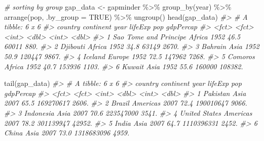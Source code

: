 \documentclass[
]{book}
\newenvironment{Shaded}{\begin{snugshade}}{\end{snugshade}}
\newcommand{\AttributeTok}[1]{\textcolor[rgb]{0.77,0.63,0.00}{#1}}
\newcommand{\CommentTok}[1]{\textcolor[rgb]{0.56,0.35,0.01}{\textit{#1}}}
\newcommand{\ConstantTok}[1]{\textcolor[rgb]{0.00,0.00,0.00}{#1}}
\newcommand{\FunctionTok}[1]{\textcolor[rgb]{0.00,0.00,0.00}{#1}}
\newcommand{\NormalTok}[1]{#1}
\newcommand{\OtherTok}[1]{\textcolor[rgb]{0.56,0.35,0.01}{#1}}
\newcommand{\SpecialCharTok}[1]{\textcolor[rgb]{0.00,0.00,0.00}{#1}}
\begin{document}
\begin{Shaded}
\begin{Highlighting}[]
\CommentTok{\# sorting by group}
\NormalTok{gap\_data }\OtherTok{\textless{}{-}}
\NormalTok{gapminder }\SpecialCharTok{\%\textgreater{}\%}
  \FunctionTok{group\_by}\NormalTok{(year) }\SpecialCharTok{\%\textgreater{}\%}
  \FunctionTok{arrange}\NormalTok{(pop, }\AttributeTok{.by\_group =} \ConstantTok{TRUE}\NormalTok{) }\SpecialCharTok{\%\textgreater{}\%}
  \FunctionTok{ungroup}\NormalTok{()}
\FunctionTok{head}\NormalTok{(gap\_data)}
\CommentTok{\#\textgreater{} \# A tibble: 6 x 6}
\CommentTok{\#\textgreater{}   country               continent  year lifeExp    pop gdpPercap}
\CommentTok{\#\textgreater{}   \textless{}fct\textgreater{}                 \textless{}fct\textgreater{}     \textless{}int\textgreater{}   \textless{}dbl\textgreater{}  \textless{}int\textgreater{}     \textless{}dbl\textgreater{}}
\CommentTok{\#\textgreater{} 1 Sao Tome and Principe Africa     1952    46.5  60011      880.}
\CommentTok{\#\textgreater{} 2 Djibouti              Africa     1952    34.8  63149     2670.}
\CommentTok{\#\textgreater{} 3 Bahrain               Asia       1952    50.9 120447     9867.}
\CommentTok{\#\textgreater{} 4 Iceland               Europe     1952    72.5 147962     7268.}
\CommentTok{\#\textgreater{} 5 Comoros               Africa     1952    40.7 153936     1103.}
\CommentTok{\#\textgreater{} 6 Kuwait                Asia       1952    55.6 160000   108382.}

\FunctionTok{tail}\NormalTok{(gap\_data)}
\CommentTok{\#\textgreater{} \# A tibble: 6 x 6}
\CommentTok{\#\textgreater{}   country       continent  year lifeExp        pop gdpPercap}
\CommentTok{\#\textgreater{}   \textless{}fct\textgreater{}         \textless{}fct\textgreater{}     \textless{}int\textgreater{}   \textless{}dbl\textgreater{}      \textless{}int\textgreater{}     \textless{}dbl\textgreater{}}
\CommentTok{\#\textgreater{} 1 Pakistan      Asia       2007    65.5  169270617     2606.}
\CommentTok{\#\textgreater{} 2 Brazil        Americas   2007    72.4  190010647     9066.}
\CommentTok{\#\textgreater{} 3 Indonesia     Asia       2007    70.6  223547000     3541.}
\CommentTok{\#\textgreater{} 4 United States Americas   2007    78.2  301139947    42952.}
\CommentTok{\#\textgreater{} 5 India         Asia       2007    64.7 1110396331     2452.}
\CommentTok{\#\textgreater{} 6 China         Asia       2007    73.0 1318683096     4959.}


\end{Highlighting}
\end{Shaded}
\end{document}
